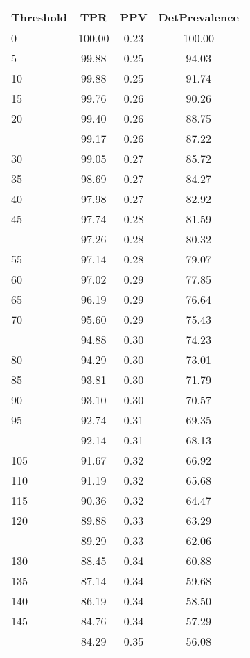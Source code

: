 \begin{table}[ht]
\centering
\begin{tabular}{lccc}
  \toprule
Threshold & TPR & PPV & DetPrevalence \\ 
  \midrule
0 & 100.00 & 0.23 & 100.00 \\ 
  5 & 99.88 & 0.25 & 94.03 \\ 
  10 & 99.88 & 0.25 & 91.74 \\ 
  15 & 99.76 & 0.26 & 90.26 \\ 
  20 & 99.40 & 0.26 & 88.75 \\ 
   \addlinespace
25 & 99.17 & 0.26 & 87.22 \\ 
  30 & 99.05 & 0.27 & 85.72 \\ 
  35 & 98.69 & 0.27 & 84.27 \\ 
  40 & 97.98 & 0.27 & 82.92 \\ 
  45 & 97.74 & 0.28 & 81.59 \\ 
   \addlinespace
50 & 97.26 & 0.28 & 80.32 \\ 
  55 & 97.14 & 0.28 & 79.07 \\ 
  60 & 97.02 & 0.29 & 77.85 \\ 
  65 & 96.19 & 0.29 & 76.64 \\ 
  70 & 95.60 & 0.29 & 75.43 \\ 
   \addlinespace
75 & 94.88 & 0.30 & 74.23 \\ 
  80 & 94.29 & 0.30 & 73.01 \\ 
  85 & 93.81 & 0.30 & 71.79 \\ 
  90 & 93.10 & 0.30 & 70.57 \\ 
  95 & 92.74 & 0.31 & 69.35 \\ 
   \addlinespace
100 & 92.14 & 0.31 & 68.13 \\ 
  105 & 91.67 & 0.32 & 66.92 \\ 
  110 & 91.19 & 0.32 & 65.68 \\ 
  115 & 90.36 & 0.32 & 64.47 \\ 
  120 & 89.88 & 0.33 & 63.29 \\ 
   \addlinespace
125 & 89.29 & 0.33 & 62.06 \\ 
  130 & 88.45 & 0.34 & 60.88 \\ 
  135 & 87.14 & 0.34 & 59.68 \\ 
  140 & 86.19 & 0.34 & 58.50 \\ 
  145 & 84.76 & 0.34 & 57.29 \\ 
   \addlinespace
150 & 84.29 & 0.35 & 56.08 \\ 

\end{tabular}
\end{table}
